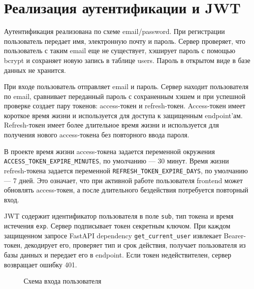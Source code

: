 \documentclass[14pt,a4paper]{extreport}
\begin{document}
\section{Реализация аутентификации и JWT}

Аутентификация реализована по схеме email/password. При регистрации пользователь передает имя, электронную почту и пароль. Сервер проверяет, что пользователь с таким email еще не существует, хэширует пароль с помощью bcrypt и сохраняет новую запись в таблице users. Пароль в открытом виде в базе данных не хранится.

При входе пользователь отправляет email и пароль. Сервер находит пользователя по email, сравнивает переданный пароль с сохраненным хэшем и при успешной проверке создает пару токенов: access-токен и refresh-токен. Access-токен имеет короткое время жизни и используется для доступа к защищенным endpoint'ам. Refresh-токен имеет более длительное время жизни и используется для получения нового access-токена без повторного ввода пароля.

В проекте время жизни access-токена задается переменной окружения \texttt{ACCESS\_TOKEN\_EXPIRE\_MINUTES}, по умолчанию --- 30 минут. Время жизни refresh-токена задается переменной \texttt{REFRESH\_TOKEN\_EXPIRE\_DAYS}, по умолчанию --- 7 дней. Это означает, что при активной работе пользователя frontend может обновлять access-токен, а после длительного бездействия потребуется повторный вход.

JWT содержит идентификатор пользователя в поле \texttt{sub}, тип токена и время истечения \texttt{exp}. Сервер подписывает токен секретным ключом. При каждом защищенном запросе FastAPI dependency \texttt{get\_current\_user} извлекает Bearer-токен, декодирует его, проверяет тип и срок действия, получает пользователя из базы данных и передает его в endpoint. Если токен недействителен, сервер возвращает ошибку 401.

\begin{figure}[H]
\centering
{}
\caption{Схема входа пользователя}
\end{figure}
\end{document}
